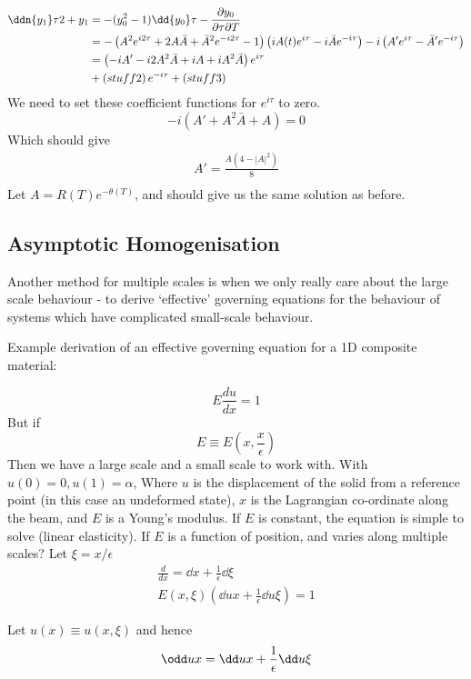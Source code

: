 \documentclass{X:/Documents/Coding/Latex/myassignment}
\begin{document}
\begin{align*}
  \ddn{y_1}\tau 2 + y_1 &= -(y_0^2 - 1)\dd{y_0}\tau - \frac{\partial y_{0}}{\partial \tau \partial T}\\
  &=-\left(A^2 e^{i2 \tau} +2A\bar{A} +\bar{A}^2e^{-i2\tau} -1\right) \left(iA(t)e^{i \tau} - i\bar{A}e^{-i\tau}\right) - i\left(A' e^{i\tau} - \bar{A}' e^{-i\tau}\right)\\
  &=\left(-iA'-i2A^2\bar{A} + iA + iA^2 \bar{A}\right) e^{i\tau}\\
  &+ \left(stuff2\right) e^{-i\tau} + \left(stuff3\right)\\
\end{align*}
We need to set these coefficient functions for $e^{i\tau}$ to zero.
\[-i\left(A' + A^2\bar{A} + A \right) =0 \]
Which should give
\begin{align*}
    A' = \frac{A(4-|A|^2)}{8}\\
\end{align*}
Let $A = R(T)e^{-\theta(T)}$, and should give us the same solution as before.


\subsection{Asymptotic Homogenisation}
Another method for multiple scales is when we only really care about the large scale behaviour - to derive `effective' governing equations for the behaviour of systems which have complicated small-scale behaviour.

Example derivation of an effective governing equation for a 1D composite material:

\[E \frac{du}{dx} = 1\]
But if 
\[E\equiv E(x,\frac{x}{\epsilon})\]
Then we have a large scale and a small scale to work with.
With $u(0) =0, u(1) = \alpha$,
Where $u$ is the displacement of the solid from a reference point (in this case an undeformed state), $x$ is the Lagrangian co-ordinate along the beam, and $E$ is a Young's modulus. If $E$ is constant, the equation is simple to solve (linear elasticity). If $E$ is a function of position, and varies along multiple scales?
Let $\xi = x/\epsilon$
\begin{align*}
    \frac{d}{dx} = \dd{}x + \frac{1}{\epsilon} \dd{}\xi\\
    E(x,\xi) \left(\dd ux + \frac1{\epsilon} \dd u\xi\right) = 1
\end{align*}


Let $u(x) \equiv u(x,\xi)$ and hence
\[\odd ux = \dd ux + \frac1\epsilon \dd u\xi\]
\end{document}
